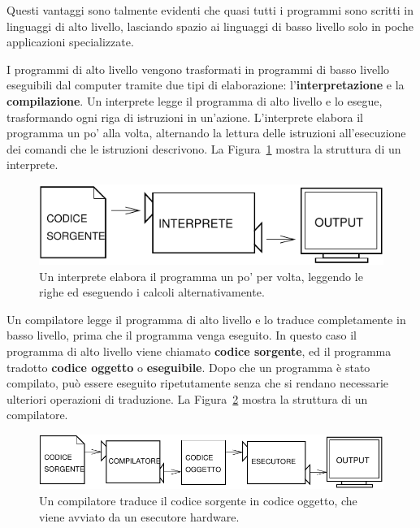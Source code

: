 \documentclass[10pt]{book}
\begin{document}
Questi vantaggi sono talmente evidenti che quasi tutti i programmi sono scritti in linguaggi di alto livello, lasciando spazio ai linguaggi di basso livello solo in poche applicazioni specializzate.

I programmi di alto livello vengono trasformati in programmi di basso livello eseguibili dal computer tramite due tipi di elaborazione: l'{\bf interpretazione} e la {\bf compilazione}. Un interprete legge il programma di alto livello e lo esegue, trasformando ogni riga di istruzioni in un'azione. L'interprete elabora il programma un po' alla volta, alternando la lettura delle istruzioni all'esecuzione dei comandi che le istruzioni descrivono. La Figura~\ref{fig.interpret} mostra la struttura di un interprete.

\begin{figure}
\centerline
{\includegraphics[scale=0.9]{figs/interpret.pdf}}
\caption{Un interprete elabora il programma un po' per volta, leggendo le righe ed eseguendo i calcoli alternativamente.}
\label{fig.interpret}
\end{figure}

Un compilatore legge il programma di alto livello e lo traduce completamente in basso livello, prima che il programma venga eseguito. In questo caso il programma di alto livello viene chiamato {\bf codice sorgente}, ed il programma tradotto {\bf codice oggetto} o {\bf eseguibile}. Dopo che un programma è stato compilato, può essere eseguito ripetutamente senza che si rendano necessarie ulteriori operazioni di traduzione. La Figura~\ref{fig.compile} mostra la struttura di un compilatore.

\begin{figure}
\centerline
{\includegraphics[scale=0.9]{figs/compile.pdf}}
\caption{Un compilatore traduce il codice sorgente in codice oggetto, che viene avviato da un esecutore hardware.}
\label{fig.compile}
\end{figure}
\end{document}

